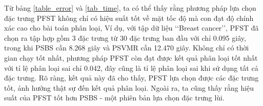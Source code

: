 \begin{table*}[htbp]
	\caption{Thời gian chạy và số lượng đặc trưng chọn được}
\end{table*}  

Từ bảng \ref{table_error} và \ref{tab_time}, ta có thể thấy rằng phương pháp lựa chọn đặc trưng PFST không chỉ có hiệu suất tốt về mặt tốc độ mà con đạt độ chính xác cao cho bài toán phân loại, Ví dụ, với tập dữ liệu \lq\lq Breast cancer\rq\rq, PFST đã chọn ra tập hợp gồm 3 đặc trưng từ 30 đặc trưng ban đầu với chỉ 0.095 giây, trong khi PSBS cần 8.268 giây và PSVMR cần 12.470 giây. Không chỉ có thời gian chạy tốt nhất, phương pháp PFST còn đạt được kết quả phân loại tốt nhất với tỉ lệ phân loại sai chỉ 0.042, đây cũng là tỉ lệ phân loại sai khi sử dụng tất cả đặc trưng. Rõ ràng, kết quả này đã cho thấy, PFST lựa chọn được các đặc trưng tốt, ảnh hưởng thật sự đến kết quả phân loại. Ngoài ra, ta cũng thấy rằng hiệu suất của PFST tốt hơn PSBS - một phiên bản lựa chọn đặc trưng lùi.


